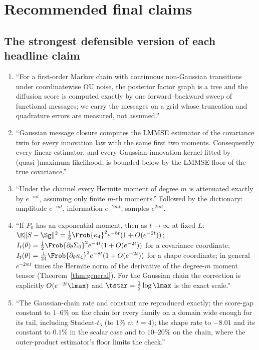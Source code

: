\section{Recommended final claims}
\label{sec:claims}

\subsection{The strongest defensible version of each headline claim}

\begin{enumerate}
\item {} ``For a first-order Markov chain with continuous non-Gaussian transitions under coordinatewise OU noise, the posterior factor graph is a tree and the diffusion score is computed exactly by one forward--backward sweep of functional messages; we carry the messages on a grid whose truncation and quadrature errors are measured, not assumed.''
\item {} ``Gaussian message closure computes the LMMSE estimator of the covariance twin for every innovation law with the same first two moments. Consequently every linear estimator, and every Gaussian-innovation kernel fitted by (quasi-)maximum likelihood, is bounded below by the LMMSE floor of the true covariance.''
\item {} ``Under the channel every Hermite moment of degree $m$ is attenuated exactly by $e^{-mt}$, assuming only finite $m$-th moments.'' Followed by the dictionary: amplitude $e^{-mt}$, information $e^{-2mt}$, samples $e^{2mt}$.
\item {} ``If $P_0$ has an exponential moment, then as $t\to\infty$ at fixed $L$: $\E\|S-\Sg\|^2=\tfrac16\Frob{\kappa_4}^2e^{-8t}(1+O(e^{-2t}))$; $I_t(\theta)=\tfrac12\Frob{\partial_\theta\Sigma_0}^2e^{-4t}(1+O(e^{-2t}))$ for a covariance coordinate; $I_t(\theta)=\tfrac1{24}\Frob{\partial_\theta\kappa_4}^2e^{-8t}(1+O(e^{-2t}))$ for a shape coordinate; in general $e^{-2mt}$ times the Hermite norm of the derivative of the degree-$m$ moment tensor (Theorem~\ref{thm:general}). For the Gaussian chain the correction is explicitly $O(e^{-2t}\lmax)$ and $\tstar=\tfrac12\log\lmax$ is the exact scale.''
\item {} ``The Gaussian-chain rate and constant are reproduced exactly; the score-gap constant to $1$--$6\%$ on the chain for every family on a domain wide enough for its tail, including Student-$t_5$ (to $1\%$ at $t=4$); the shape rate to $-8.01$ and its constant to $0.1\%$ in the scalar case and to $10$--$20\%$ on the chain, where the outer-product estimator's floor limits the check.''

\end{enumerate}
